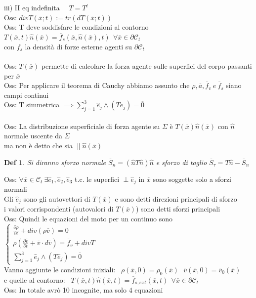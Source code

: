 \documentclass{article}
\theoremstyle{unnumbered}
\newtheorem* {theoremT}{Def}
\theoremstyle{unnumbered1}
\newenvironment{defi}{\begin{gBox}\begin{theoremT}}{\end{theoremT}\end{gBox}}
\begin{document}
iii) II eq indefinita \ \ $T=T^t$\\
%
%
Oss: $divT(\overline{x};t):=tr(dT(\overline{x};t))$\\
%
Oss: T deve soddisfare le condizioni al contorno $T(\overline{x},t)\hat{n}(\overline{x})=\overline{f}_s(\overline{x},\hat{n}(\overline{x}),t) \ \ \forall\overline{x}\in\partial\mathcal{C}_t$ \\
\phantom{Oss: }con $f_s$ la densità di forze esterne agenti su $\partial\mathcal{C}_t$\\ \\
%
%
%
Oss: $T(\overline{x})$ permette di calcolare la forza agente sulle superfici del corpo passanti per $\overline{x}$\\
%
%
%
Oss: Per applicare il teorema di Cauchy abbiamo assunto che $\rho, \overline{a}, \overline{f}_v\ e\ \overline{f}_s$ siano campi continui\\
%
%
%
Oss: T simmetrica $\implies \sum_{j=1}^3\hat{e}_j\wedge(T\hat{e}_j)=\overline{0}$ \\ \\
%
%
Oss: La distribuzione superficiale di forza agente su $\Sigma$ è $T(\overline{x})\hat{n}(\overline{x})$ con $\hat{n}$ normale uscente da $\Sigma$ \\
%
\phantom{Oss: } ma non è detto che sia $\parallel \hat{n}(\overline{x})$
%
\begin{defi}
Si diranno sforzo normale $\overline{S}_n=(\hat{n}T\hat{n})\hat{n}$ e sforzo di taglio $\overline{S}_{\tau}=T\hat{n}-\overline{S}_n$
\end{defi}
%
%
Oss: $\forall \overline{x}\in\mathcal{C}_t \ \exists \hat{e}_1,\hat{e}_2,\hat{e}_3$ t.c. le superfici $\perp \hat{e}_j$ in $\overline{x}$ sono soggette solo a sforzi normali\\
\phantom{Oss: }Gli $\hat{e}_j$ sono gli autovettori di $T(\overline{x})$ e sono detti direzioni principali di sforzo\\ 
\phantom{Oss: }i valori corrispondenti (autovalori di $T(\overline{x})$) sono detti sforzi principali\\
%
%
%
Oss: Quindi le equazioni del moto per un continuo sono \ \ $\begin{cases}
\frac{\partial\rho}{\partial t} +div(\rho\overline{v})=0\\
\rho(\frac{\partial\overline{v}}{\partial t} + \overline{v}\cdot d\overline{v})=\overline{f}_v+divT\\
\sum_{j=1}^3\hat{e}_j\wedge(T\hat{e}_j)=\overline{0}
\end{cases}$\\
\phantom{Oss: }Vanno aggiunte le condizioni iniziali: \ $\rho(\overline{x},0)=\rho_0(\overline{x}) \ \ \ \overline{v}(\overline{x},0)=\overline{v}_0(\overline{x})$ \\
\phantom{Oss: }e quelle al contorno: \ $ T(\overline{x},t)\hat{n}(\overline{x},t)=\overline{f}_{s,ext}(\overline{x},t) \ \ \forall \overline{x}\in\partial\mathcal{C}_t$ \\
Oss: In totale avrò 10 incognite, ma solo 4 equazioni
\end{document}
